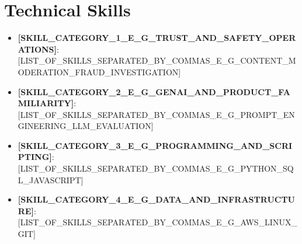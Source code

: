 ﻿%
\section{Technical Skills}
\begin{itemize}[leftmargin=0.15in, label={}, itemsep=3pt]
  \small \item \textbf{[SKILL\_CATEGORY\_1\_E\_G\_TRUST\_AND\_SAFETY\_OPERATIONS]}{: [LIST\_OF\_SKILLS\_SEPARATED\_BY\_COMMAS\_E\_G\_CONTENT\_MODERATION\_FRAUD\_INVESTIGATION]}
  \small \item \textbf{[SKILL\_CATEGORY\_2\_E\_G\_GENAI\_AND\_PRODUCT\_FAMILIARITY]}{: [LIST\_OF\_SKILLS\_SEPARATED\_BY\_COMMAS\_E\_G\_PROMPT\_ENGINEERING\_LLM\_EVALUATION]}
  \small \item \textbf{[SKILL\_CATEGORY\_3\_E\_G\_PROGRAMMING\_AND\_SCRIPTING]}{: [LIST\_OF\_SKILLS\_SEPARATED\_BY\_COMMAS\_E\_G\_PYTHON\_SQL\_JAVASCRIPT]}
  \small \item \textbf{[SKILL\_CATEGORY\_4\_E\_G\_DATA\_AND\_INFRASTRUCTURE]}{: [LIST\_OF\_SKILLS\_SEPARATED\_BY\_COMMAS\_E\_G\_AWS\_LINUX\_GIT]}
\end{itemize}
